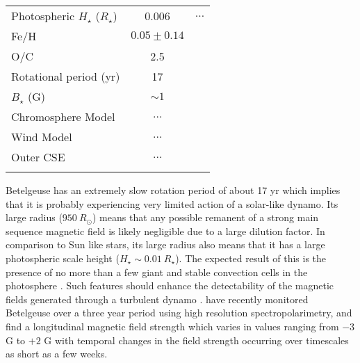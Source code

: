 \begin{table}[!hbt]
\begin{center}
\begin{tabular}{lcc}
Photospheric $H_{\star}$ ($R_{\star}$)& 0.006 & $\dots$\\
Fe/H& $0.05 \pm 0.14$ & \cite{ramirez_2000}\\
O/C& 2.5 & \cite{lambert_1984}\\
Rotational period (yr) & 17 & \cite{uitenbroek_1998}\\
$B_{\star}$ (G) & $\sim 1$ & \cite{auriere_2010} \\
Chromosphere Model & $\ldots$ & \cite{harper_2001} \\
Wind Model &  $\ldots$ &\cite{harper_2001}\\ 
Outer CSE &  $\ldots$ &\cite{rodgers_1991}\\ 
\hline
\rule{0pt}{2.0ex}
\end{tabular}
\label{tab:3.1}
\end{center}
\end{table}

Betelgeuse has an extremely slow rotation period of about 17 yr \citep{uitenbroek_1998} which implies that it is probably experiencing very limited action of a solar-like dynamo. Its large radius ($950 \ R_{\odot}$) means that any possible remanent of a strong main sequence magnetic field is likely negligible due to a large dilution factor. In comparison to Sun like stars, its large radius also means that it has a large photospheric scale height ($H_{\star} \sim 0.01 \ R_{\star}$). The expected result of this is the presence of no more than a few giant and stable convection cells in the photosphere \cite{schwarzschild_1975}. Such features should enhance the detectability of the magnetic fields generated through a turbulent dynamo \citep{vogler_2007}. \cite{bedecarrax_2013} have recently monitored Betelgeuse over a three year period using high resolution spectropolarimetry, and find a longitudinal magnetic field strength which varies  in values ranging from $-3$ G to $+2$ G with temporal changes in the field strength occurring over timescales as short as a few weeks.

